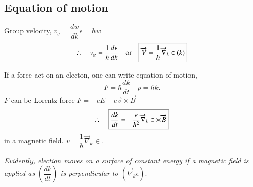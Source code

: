 \chapter{}\label{lec23}

\section*{Equation of motion}

Group velocity, $v_{g}=\dfrac{dw}{dk}$\quad $\epsilon=\hbar w$
$$
\therefore\quad v_{g}=\dfrac{1}{\hbar}\dfrac{d\epsilon}{dk}\quad \text{or}\quad \fbox{$\overrightarrow{V}=\dfrac{1}{\hbar}\overrightarrow{\nabla}_{k}\in (k)$}
$$

If a force act on an electon, one can write equation of motion,
$$
F=\hbar \dfrac{dk}{dt}\quad p=\hbar k.
$$
$F$ can be Lorentz force $F=-eE-e\overrightarrow{v}\times \overrightarrow{B}$
$$
\therefore\quad \fbox{$\dfrac{dk}{dt}=-\dfrac{e}{\hbar^{2}}\overrightarrow{\nabla}_{k}\in \times \overrightarrow{B}$}
$$
in a magnetic field. $v=\dfrac{1}{\hbar}\overrightarrow{\nabla}_{k}\in$.

{\em Evidently, election moves on a surface of constant energy if a magnetic field is applied as $\left(\dfrac{dk}{dt}\right)$ is perpendicular to $(\overrightarrow{\nabla}_{k}\epsilon)$}.

